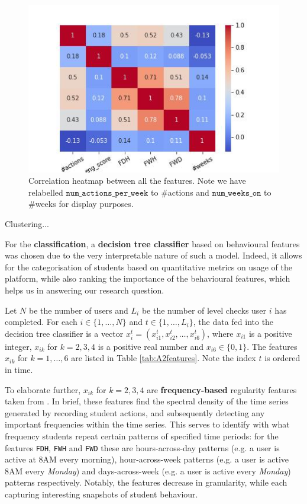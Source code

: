 \documentclass[sigplan,screen]{acmart}
\begin{document}
\begin{figure}
    \centering
    \includegraphics[width=\linewidth]{reports/figures/feature_corr.jpg}
    \caption{Correlation heatmap between all the features. Note we have relabelled $\texttt{num\_actions\_per\_week}$ to \#actions and $\texttt{num\_weeks\_on}$ to \#weeks for display purposes.}
    \label{fig:feature_corr}
\end{figure}


{\color{red}Clustering...}

For the \textbf{classification}, a \textbf{decision tree classifier} based on behavioural features was chosen due to the very interpretable nature of such a model. Indeed, it allows for the categorisation of students based on quantitative metrics on usage of the platform, while also ranking the importance of the behavioural features, which helps us in answering our research question. 

Let $N$ be the number of users and $L_i$ be the number of level checks user $i$ has completed. For each $i \in \{1,\ldots,N\}$ and $t \in \{1, \ldots, L_i\}$, the data fed into the decision tree classifier is a vector $x_i^t = (x_{i1}^t, x_{i2}^t, \ldots, x_{i6}^t)$, where $x_{i1}$ is a positive integer, $x_{ik}$ for $k=2,3,4$ is a positive real number and $x_{i6} \in \{0,1\}$. The features $x_{ik}$ for $k=1,\ldots, 6$ are listed in Table 
\ref{tab:A2features}. Note the index $t$ is ordered in time. 

To elaborate further, $x_{ik}$ for $k=2,3,4$ are \textbf{frequency-based} regularity features taken from \cite{quantifyreg}. In brief, these features find the spectral density of the time series generated by recording student actions, and subsequently detecting any important frequencies within the time series. This serves to identify with what frequency students repeat certain patterns of specified time periods: for the features \texttt{FDH}, \texttt{FWH} and \texttt{FWD} these are hours-across-day patterns (e.g. a user is active at 8AM every morning), hour-across-week patterns (e.g. a user is active 8AM every \textit{Monday}) and days-across-week (e.g. a user is active every \textit{Monday}) patterns respectively. Notably, the features decrease in granularity, while each capturing interesting snapshots of student behaviour. 
\end{document}
